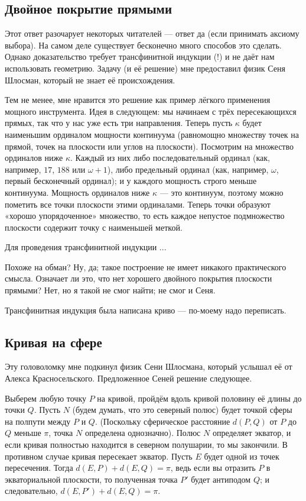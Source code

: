 \subsection*{Двойное покрытие прямыми}

Этот ответ разочарует некоторых читателей --- ответ да (если принимать аксиому выбора).
На самом деле существует бесконечно
много способов это сделать.
Однако доказательство требует трансфинитной индукции (!) и не даёт нам использовать геометрию.
Задачу (и её решение) мне предоставил физик Сеня Шлосман, который не знает её происхождения.

Тем не менее, мне нравится это решение как пример лёгкого применения мощного инструмента.
Идея в следующем: мы начинаем с трёх пересекающихся прямых, так что у нас уже есть три направления.
Теперь пусть $\kappa$ будет наименьшим ординалом мощности континуума (равномощно множеству точек на прямой, точек на плоскости или углов на плоскости).
Посмотрим на множество ординалов ниже $\kappa$.
Каждый из них либо последовательный ординал (как, например, $17$, $188$ или $\omega + 1$), либо предельный ординал (как, например, $\omega$, первый бесконечный ординал);
и у каждого мощность строго меньше континуума.
Мощность ординалов ниже $\kappa$ --- это континуум, поэтому можно пометить все точки плоскости этими ординалами. Теперь точки образуют «хорошо упорядоченное» множество, то есть каждое непустое подмножество плоскости содержит точку с наименьшей меткой.

Для проведения трансфинитной индукции ...

Похоже на обман?
Ну, да; такое построение не имеет никакого практического смысла.
Означает ли это, что нет хорошего двойного покрытия плоскости прямыми?
Нет, но я такой не смог найти; не смог и Сеня.

\begin{addedbytheeditors}
Трансфинитная индукция была написана криво --- по-моему надо переписать.
\end{addedbytheeditors}


\subsection*{Кривая на сфере}

Эту головоломку мне подкинул физик Сени Шлосмана, который услышал её от Алекса Красносельского.
Предложенное Сеней решение следующее.

Выберем любую точку $P$ на кривой, пройдём вдоль кривой половину её длины до точки $Q$.
Пусть $N$ (будем думать, что это северный полюс) будет точкой сферы на полпути между $P$ и $Q$.
(Поскольку сферическое расстояние $d(P, Q)$ от $P$ до $Q$ меньше $\pi$, точка $N$ определена однозначно).
Полюс $N$ определяет экватор, и если кривая полностью находится в северном полушарии, то мы закончили.
В противном случае кривая пересекает экватор.
Пусть $E$ будет одной из точек пересечения.
Тогда $d(E,P) + d(E,Q) = \pi$, ведь если вы отразить $P$ в экваториальной плоскости, то полученная точка $P'$ будет антиподом $Q$; и следовательно, $d(E, P') + d(E, Q) = \pi$.

